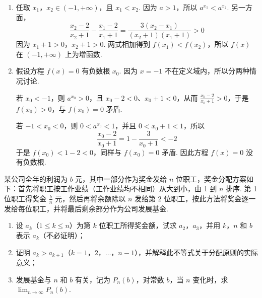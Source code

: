 \begin{solution}
\begin{enumerate}
\item 任取 \(x_1\)，\(x_2\in(-1,+\infty)\)，且 \(x_1<x_2\). 因为 \(a>1\)，所以 \(a^{x_1}<a^{x_2}\). 另一方面，
\[
\frac{x_2-2}{x_2+1}-\frac{x_1-2}{x_1+1}=\frac{3(x_2-x_1)}{(x_2+1)(x_1+1)}>0
\]
因为 \(x_1+1>0\)，\(x_2+1>0\). 两式相加得到 \(f(x_1)<f(x_2)\)，所以 \(f(x)\) 在 \((-1,+\infty)\) 上为增函数.

\item 假设方程 \(f(x)=0\) 有负数根 \(x_0\). 因为 \(x=-1\) 不在定义域内，所以分两种情况讨论.

若 \(x_0<-1\)，则 \(a^{x_0}>0\)，且 \(x_0-2<0\)、\(x_0+1<0\)，从而 \(\frac{x_0-2}{x_0+1}>0\)，于是 \(f(x_0)>0\)，与 \(f(x_0)=0\) 矛盾.

若 \(-1<x_0<0\)，则 \(0<a^{x_0}<1\)，并且 \(0<x_0+1<1\)，所以
\[
\frac{x_0-2}{x_0+1}=1-\frac{3}{x_0+1}<-2
\]
于是 \(f(x_0)<1-2<0\)，同样与 \(f(x_0)=0\) 矛盾. 因此方程 \(f(x)=0\) 没有负数根.
\end{enumerate}
\end{solution}

\begin{problem}
某公司全年的利润为 \(b\text{ 元}\)，其中一部分作为奖金发给 \(n\) 位职工，奖金分配方案如下：首先将职工按工作业绩（工作业绩均不相同）从大到小，由 1 到 \(n\) 排序. 第 1 位职工得奖金 \(\frac{b}{n}\text{ 元}\)，然后再将余额除以 \(n\) 发给第 2 位职工，按此方法将奖金逐一发给每位职工，并将最后剩余部分作为公司发展基金.
\begin{enumerate}
\item 设 \(a_k\)（\(1 \leqslant k \leqslant n\)）为第 \(k\) 位职工所得奖金额，试求 \(a_2\)，\(a_3\)，并用 \(k\)，\(n\) 和 \(b\) 表示 \(a_k\)（不必证明）；
\item 证明 \(a_{k} > a_{k + 1}\)（\(k = 1\)，\(2\)，\(\dots\)，\(n - 1\)），并解释此不等式关于分配原则的实际意义；
\item 发展基金与 \(n\) 和 \(b\) 有关，记为 \(P_{n}(b)\)，对常数 \(b\)，当 \(n\) 变化时，求 \(\displaystyle\lim_{n \to \infty} P_{n}(b)\).
\end{enumerate}
\end{problem}

